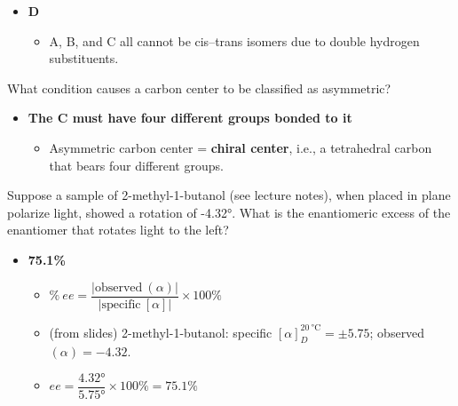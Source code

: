 \documentclass[12pt,a4paper]{article}
\begin{document}
\begin{enumerate}
{    
    \hspace*{10pt}
    \hspace*{10pt}
    \hspace*{10pt}
    }
        \begin{itemize}
            \item {\color{o-Sun}\textbf{D}} 
            \begin{itemize}
                \item A, B, and C all cannot be cis--trans isomers due to double hydrogen substituents.
            \end{itemize}
        \end{itemize}
    {\color{G-Moon}\item What condition causes a carbon center to be classified as asymmetric?}
        \begin{itemize}
            \item {\color{o-Sun}\textbf{The C must have four different groups bonded to it}} 
            \begin{itemize}
                \item Asymmetric carbon center = \textbf{chiral center}, i.e., a tetrahedral carbon that bears four different groups.
            \end{itemize}
        \end{itemize}
    {\color{G-Moon}\item Suppose a sample of 2-methyl-1-butanol (see lecture notes), when placed in plane polarize light, showed a rotation of \ang{-4.32}. What is the enantiomeric excess of the enantiomer that rotates light to the left?}
        \begin{itemize}
            \item {\color{o-Sun}\textbf{75.1\%}} 
            \begin{itemize}
                \item \(\%~ee = \dfrac{|\text{observed}~(\alpha)|}{|\text{specific}~[\alpha]|} \times 100\%\)
                \item (from slides) 2-methyl-1-butanol: specific $[\alpha]^{\SI{20}{\celsius}}_D = \pm5.75$; observed \((\alpha) = -4.32\).  
                \item \(ee = \dfrac{\ang{4.32}}{\ang{5.75}} \times 100\% = 75.1\%\)

\end{itemize}
\end{itemize}
\end{enumerate}
\end{document}
